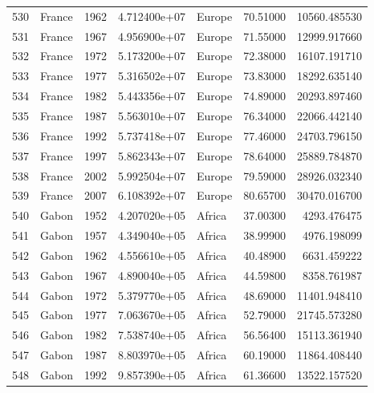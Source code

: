 \documentclass[
  letterpaper,
  DIV=11,
  numbers=noendperiod]{scrreprt}
\begin{document}
\begin{tabular}{llrrlrr}
530  &                    France &  1962 &  4.712400e+07 &    Europe &  70.51000 &   10560.485530 \\
531  &                    France &  1967 &  4.956900e+07 &    Europe &  71.55000 &   12999.917660 \\
532  &                    France &  1972 &  5.173200e+07 &    Europe &  72.38000 &   16107.191710 \\
533  &                    France &  1977 &  5.316502e+07 &    Europe &  73.83000 &   18292.635140 \\
534  &                    France &  1982 &  5.443356e+07 &    Europe &  74.89000 &   20293.897460 \\
535  &                    France &  1987 &  5.563010e+07 &    Europe &  76.34000 &   22066.442140 \\
536  &                    France &  1992 &  5.737418e+07 &    Europe &  77.46000 &   24703.796150 \\
537  &                    France &  1997 &  5.862343e+07 &    Europe &  78.64000 &   25889.784870 \\
538  &                    France &  2002 &  5.992504e+07 &    Europe &  79.59000 &   28926.032340 \\
539  &                    France &  2007 &  6.108392e+07 &    Europe &  80.65700 &   30470.016700 \\
540  &                     Gabon &  1952 &  4.207020e+05 &    Africa &  37.00300 &    4293.476475 \\
541  &                     Gabon &  1957 &  4.349040e+05 &    Africa &  38.99900 &    4976.198099 \\
542  &                     Gabon &  1962 &  4.556610e+05 &    Africa &  40.48900 &    6631.459222 \\
543  &                     Gabon &  1967 &  4.890040e+05 &    Africa &  44.59800 &    8358.761987 \\
544  &                     Gabon &  1972 &  5.379770e+05 &    Africa &  48.69000 &   11401.948410 \\
545  &                     Gabon &  1977 &  7.063670e+05 &    Africa &  52.79000 &   21745.573280 \\
546  &                     Gabon &  1982 &  7.538740e+05 &    Africa &  56.56400 &   15113.361940 \\
547  &                     Gabon &  1987 &  8.803970e+05 &    Africa &  60.19000 &   11864.408440 \\
548  &                     Gabon &  1992 &  9.857390e+05 &    Africa &  61.36600 &   13522.157520 \\

\end{tabular}
\end{document}
